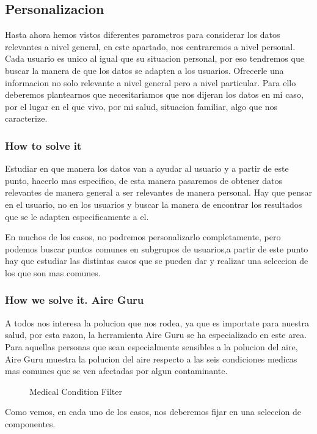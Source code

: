 \subsection{Personalizacion}
Hasta ahora hemos vistos diferentes parametros para considerar los datos relevantes a nivel general, en este apartado, nos
centraremos a nivel personal.
Cada usuario es unico al igual que su situacion personal, por eso tendremos que buscar la manera de que los datos se 
adapten a los usuarios. Ofrecerle una informacion no solo relevante a nivel general pero a nivel particular.
Para ello deberemos plantearnos que necesitariamos que nos dijeran los datos en mi caso, por el lugar en el que vivo, por
mi salud, situacion familiar, algo que nos caracterize.


\subsubsection{How to solve it} 

 Estudiar en que manera los datos van a ayudar al usuario y a partir de este punto, hacerlo mas especifico, de esta manera
 pasaremos de obtener datos relevantes de manera general a ser relevantes de manera personal. Hay que pensar en el 
 usuario, no en los usuarios y buscar la manera de encontrar los resultados que se le adapten especificamente a el.

 En muchos de los casos, no podremos personalizarlo completamente, pero podemos buscar puntos comunes en subgrupos de 
 usuarios,a partir de este punto hay que estudiar las distintas casos que se pueden dar y realizar una seleccion de los que son 
 mas comunes.

 \subsubsection{How we solve it. Aire Guru} 
A todos nos interesa la polucion que nos rodea, ya que es importate para nuestra salud, por esta razon, la herramienta
Aire Guru se ha especializado en este area. Para aquellas personas que sean especialmente sensibles a la polucion del
aire, Aire Guru muestra la polucion del aire respecto a las seis condiciones medicas mas comunes que 
se ven afectadas por algun contaminante.
 

\begin{figure}[ht]
    \centering
    \hfill
    \hfill
  
  \caption{Medical Condition Filter}
    \end{figure}
 Como vemos, en cada uno de los casos, nos deberemos fijar en una seleccion de componentes.

